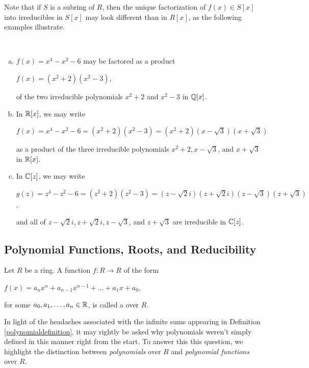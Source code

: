 \documentclass[11pt,fleqn,dvipsnames,usenames]{article}
\newcommand{\p}{\noindent}
\begin{document}
\vsp

%
\p Note that if $S$ is a subring of $R$, then the unique factorization of $f(x)\in S[x]$ into irreducibles in $S[x]$ may look different than in $R[x]$, as the following examples illustrate.
\vsp

\begin{examples}~
\begin{enumerate}[(a)]
\item $f(x) = x^4 - x^2 - 6$ may be factored as a product
\begin{center}
$f(x) = (x^2 + 2)(x^2 - 3)$,
\end{center}
of the two irreducible polynomials $x^2 + 2$ and $x^2 - 3$ in $\mathbb{Q}[x]$.
\item In $\mathbb{R}[x]$, we may write
\begin{center}
$f(x) = x^4 - x^2 - 6 = (x^2 + 2)(x^2 - 3) = (x^2 + 2)(x - \sqrt{3})(x + \sqrt{3})$
\end{center}
as a product of the three irreducible polynomials $x^2 + 2, x - \sqrt{3}$, and $x+\sqrt{3}$ in $\mathbb{R}[x]$.
\item In $\mathbb{C}[z]$, we may write
\begin{center}
$g(z) = z^4 - z^2 - 6 = (z^2 + 2)(z^2 - 3) = (z-\sqrt{2}i)(z + \sqrt{2}i)(z - \sqrt{3})(z + \sqrt{3})$,
\end{center}
and all of $z-\sqrt{2}i, z + \sqrt{2}i, z - \sqrt{3}$, and $z + \sqrt{3}$ are irreducible in $\mathbb{C}[z]$.
\end{enumerate}
\end{examples}
\newpage

%
\subsection{Polynomial Functions, Roots, and Reducibility}
\begin{definition}
Let $R$ be a ring.  A function $f:R\to R$ of the form
\begin{center}
$f(x) = a_{n}x^n + a_{n-1}x^{n-1} + \ldots + a_{1}x + a_{0}$,
\end{center}
for some $a_{0},a_{1},\ldots, a_{n}\in\mathbb{R}$, is called a  over $R$.
\end{definition}
\p In light of the headaches associated with the infinite sums appearing in Definition \ref{polynomialdefinition}, it may rightly be asked why polynomials weren't simply defined in this manner right from the start.  To answer this this question, we highlight the distinction between \emph{polynomials} over $R$ and \emph{polynomial functions} over $R$.
\vsp
\end{document}
